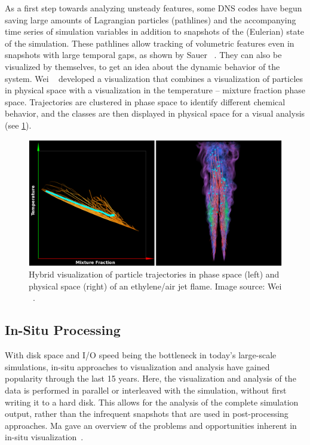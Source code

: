 %
As a first step towards analyzing unsteady features, some \ac{DNS} codes have
begun saving large amounts of Lagrangian particles (pathlines) and the
accompanying time series of simulation variables in addition to snapshots of the
(Eulerian) state of the simulation.
%
These pathlines allow tracking of volumetric features even in snapshots with
large temporal gaps, as shown by Sauer \etal~\cite{Sauer2014}.
%
They can also be visualized by themselves, to get an idea about the dynamic
behavior of the system.
%
Wei \etal~\cite{Wei2011} developed a visualization that combines a visualization
of particles in physical space with a visualization in the temperature --
mixture fraction phase space.
%
Trajectories are clustered in phase space to identify different chemical
behavior, and the classes are then displayed in physical space for a visual
analysis (see \cref{fig:wei_particle_clusters}).
%
\begin{figure}[t]
    \centering
    \includegraphics[width=\textwidth]{figures/wei_particle_clusters.png}
    \caption{Hybrid visualization of particle trajectories in phase space (left)
    and physical space (right) of an ethylene/air jet flame. Image source:
    Wei \etal~\cite{Wei2011}.}
    \label{fig:wei_particle_clusters}
\end{figure}
%
%
%
\subsection{In-Situ Processing} %
\label{sub:in_situ_processing}
%
With disk space and I/O speed being the bottleneck in today's large-scale
simulations, in-situ approaches to visualization and analysis have gained
popularity through the last 15 years.
%
Here, the visualization and analysis of the data is performed in parallel or
interleaved with the simulation, without first writing it to a hard disk.
%
This allows for the analysis of the complete simulation output, rather than
the infrequent snapshots that are used in post-processing approaches.
%
Ma gave an overview of the problems and opportunities inherent in in-situ
visualization~\cite{Ma2009}.
%

